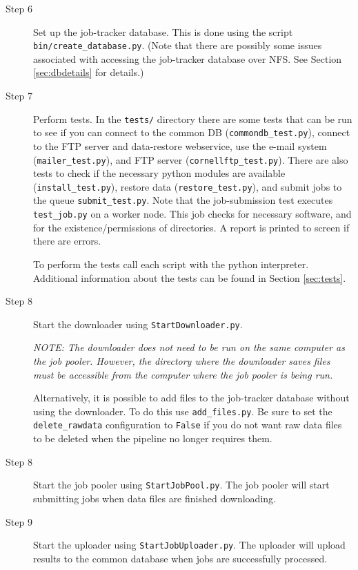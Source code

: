 \documentclass[12pt]{article}
\begin{document}
\begin{description}
    \item[Step 6] Set up the job-tracker database. This is done using the script \texttt{bin/create\_database.py}. (Note that there are possibly some issues associated with accessing the job-tracker database over NFS. See Section \ref{sec:dbdetails} for details.)

    \item[Step 7] Perform tests. In the \texttt{tests/} directory there are some tests that can be run to see if you can connect to the common DB (\texttt{commondb\_test.py}), connect to the FTP server and data-restore webservice, use the e-mail system (\texttt{mailer\_test.py}), and FTP server (\texttt{cornellftp\_test.py}). There are also tests to check if the necessary python modules are available (\texttt{install\_test.py}), restore data (\texttt{restore\_test.py}), and submit jobs to the queue \texttt{submit\_test.py}. Note that the job-submission test executes \texttt{test\_job.py} on a worker node. This job checks for necessary software, and for the existence/permissions of directories. A report is printed to screen if there are errors. 
    
    To perform the tests call each script with the python interpreter. Additional information about the tests can be found in Section \ref{sec:tests}.

    \item[Step 8] Start the downloader using \texttt{StartDownloader.py}.
        
        \smallskip
        
        \textit{NOTE: The downloader does not need to be run on the same computer as the job pooler. However, the directory where the downloader saves files must be accessible from the computer where the job pooler is being run.}
        
        \smallskip
        
        Alternatively, it is possible to add files to the job-tracker database without using the downloader. To do this use \texttt{add\_files.py}. Be sure to set the \texttt{delete\_rawdata} configuration to \texttt{False} if you do not want raw data files to be deleted when the pipeline no longer requires them. 

    \item[Step 8] Start the job pooler using \texttt{StartJobPool.py}. The job pooler will start submitting jobs when data files are finished downloading. 

    \item[Step 9] Start the uploader using \texttt{StartJobUploader.py}. The uploader will upload results to the common database when jobs are successfully processed.
\end{description}
\end{document}
